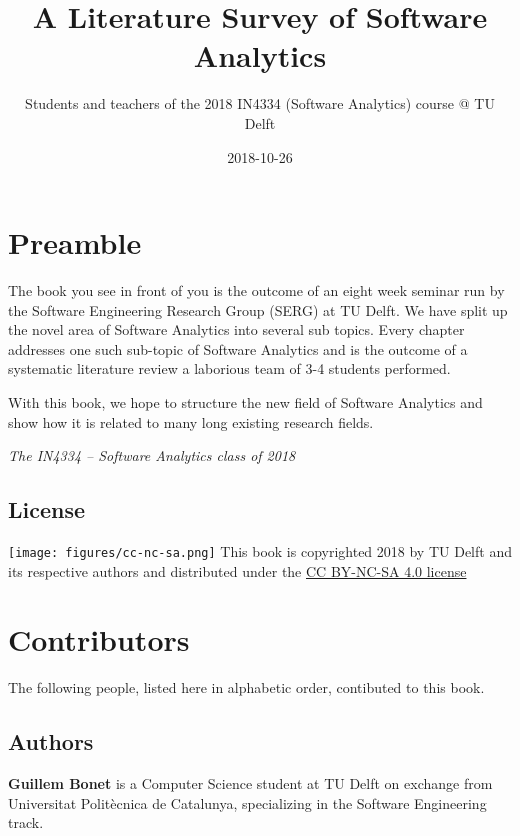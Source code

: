 \documentclass[]{book}
\title{A Literature Survey of Software Analytics}
\author{Students and teachers of the 2018 IN4334 (Software Analytics) course @
TU Delft}
\date{2018-10-26}
\begin{document}
\maketitle

{
\hypersetup{linkcolor=black}
\setcounter{tocdepth}{1}
\tableofcontents
}
\chapter*{Preamble}\label{intro}

The book you see in front of you is the outcome of an eight week seminar
run by the Software Engineering Research Group (SERG) at TU Delft. We
have split up the novel area of Software Analytics into several sub
topics. Every chapter addresses one such sub-topic of Software Analytics
and is the outcome of a systematic literature review a laborious team of
3-4 students performed.

With this book, we hope to structure the new field of Software Analytics
and show how it is related to many long existing research fields.

\emph{The IN4334 -- Software Analytics class of 2018}

\section*{License}\label{license}

\texttt{[image: figures/cc-nc-sa.png]} This book is copyrighted 2018 by
TU Delft and its respective authors and distributed under the
\href{https://creativecommons.org/licenses/by-nc-sa/4.0/}{CC BY-NC-SA
4.0 license}

\chapter*{Contributors}\label{contributors}

The following people, listed here in alphabetic order, contibuted to
this book.

\section*{Authors}\label{authors}

\textbf{Guillem Bonet} is a Computer Science student at TU Delft on
exchange from Universitat Politècnica de Catalunya, specializing in the
Software Engineering track.
\end{document}
